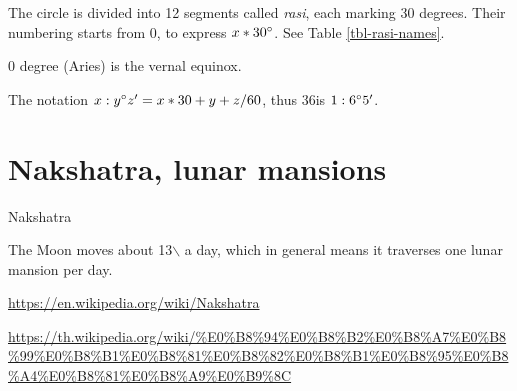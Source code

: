 \documentclass[11pt,oneside]{memoir-article}
\begin{document}
The circle is divided into 12 segments called \emph{rasi}, each marking 30 degrees.
Their numbering starts from 0, to express $x*30^\circ$. See Table
\ref{tbl-rasi-names}.

0 degree (Aries) is the vernal equinox.

The notation $x:y^\circ z^\prime = x*30 + y + z/60$, thus 36\minute is
$1:6^\circ 5^\prime$.

\section{Nakshatra, lunar mansions}
\label{sec-5-3}

Nakshatra 


The Moon moves about 13\degree$\backslash$ a day, which in general means it traverses one
lunar mansion per day.


\url{https://en.wikipedia.org/wiki/Nakshatra} 

\url{https://th.wikipedia.org/wiki/\%E0\%B8\%94\%E0\%B8\%B2\%E0\%B8\%A7\%E0\%B8\%99\%E0\%B8\%B1\%E0\%B8\%81\%E0\%B8\%82\%E0\%B8\%B1\%E0\%B8\%95\%E0\%B8\%A4\%E0\%B8\%81\%E0\%B8\%A9\%E0\%B9\%8C}
\end{document}

